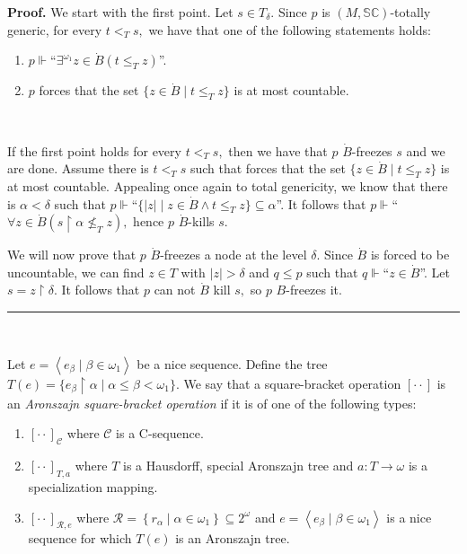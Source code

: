 \documentclass{article}
\newenvironment{proof}[1][Proof]{\noindent\textbf{#1.} }{\ \rule{0.5em}{0.5em}}
\begin{document}
\begin{proof}
We start with the first point. Let $s\in T_{\delta}.$ Since $p$ is
$(M,\mathbb{SC})$-totally generic, for every $t<_{T}s,$ we have that one of
the following statements holds:

\begin{enumerate}
\item $p\Vdash$\textquotedblleft$\exists^{\omega_{1}}z\in\dot{B}\left(
t\leq_{T}z\right)  $\textquotedblright.

\item $p$ forces that the set $\{z\in\dot{B}\mid t\leq_{T}z\}$ is at most countable.
\end{enumerate}

\qquad\ \ \ 

If the first point holds for every $t<_{T}s,$ then we have that $p$ $\dot{B}%
$-freezes $s$ and we are done. Assume there is $t<_{T}s$ such that forces that
the set $\{z\in\dot{B}\mid t\leq_{T}z\}$ is at most countable. Appealing once
again to total genericity, we know that there is $\alpha<\delta$ such that
$p\Vdash$\textquotedblleft$\{\left\vert z\right\vert \mid z\in\dot{B}\wedge
t\leq_{T}z\}\subseteq\alpha$\textquotedblright. It follows that $p\Vdash
$\textquotedblleft$\forall z\in\dot{B}\left(  s\upharpoonright\alpha\nleq
_{T}z\right)  ,$ hence $p$ $\dot{B}$-kills $s.$

\qquad\qquad\qquad\qquad\qquad

We will now prove that $p$ $\dot{B}$-freezes a node at the level $\delta.$
Since $\dot{B}$ is forced to be uncountable, we can find $z\in T$ with
$\left\vert z\right\vert >\delta$ and $q\leq p$ such that $q\Vdash
$\textquotedblleft$z\in\dot{B}$\textquotedblright. Let $s=z\upharpoonright
\delta.$ It follows that $p$ can not $\dot{B}$ kill $s,$ so $p$ $B$-freezes it.
\end{proof}

\qquad\ \ \qquad\ \ 

Let $e=\left\langle e_{\beta}\mid\beta\in\omega_{1}\right\rangle $ be a nice
sequence. Define the tree $T\left(  e\right)  =\{e_{\beta}\upharpoonright
\alpha\mid\alpha\leq\beta<\omega_{1}\}.$ We say that a square-bracket
operation $[\cdot\cdot]$ is an \emph{Aronszajn square-bracket operation} if it
is of one of the following types:

\begin{enumerate}
\item $[\cdot\cdot]_{\mathcal{C}}$ where $\mathcal{C}$ is a \textsf{C}-sequence.

\item $[\cdot\cdot]_{T,a}$ where $T$ is a Hausdorff, special Aronszajn tree
and $a:T\longrightarrow\omega$ is a specialization mapping.

\item $[\cdot\cdot]_{\mathcal{R},e}$ where $\mathcal{R}=\left\{  r_{\alpha
}\mid\alpha\in\omega_{1}\right\}  \subseteq2^{\omega}$ and $e=\left\langle
e_{\beta}\mid\beta\in\omega_{1}\right\rangle $ is a nice sequence for which
$T\left(  e\right)  $ is an Aronszajn tree.
\end{enumerate}
\end{document}
